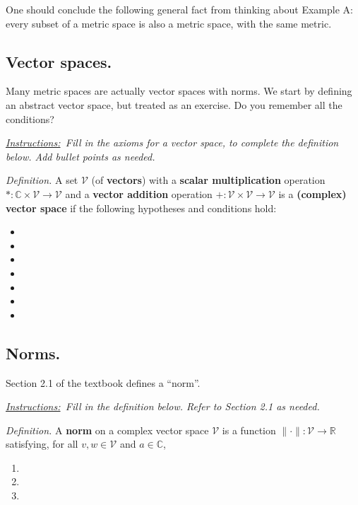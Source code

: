 \documentclass[12pt]{article}
\newcommand{\cV}{\mathcal{V}}
\newcommand{\CC}{\mathbb{C}}
\newcommand{\RR}{\mathbb{R}}
\newcommand{\sect}[1]{\subsection*{#1.}}
\newcommand{\defin}{\emph{Definition.}\,\,}
\newcommand{\instruct}[2]{\emph{\underline{Instructions:}\, #2} \vspace*{#1mm}}
\begin{document}
One should conclude the following general fact from thinking about Example A: every subset of a metric space is also a metric space, with the same metric.


\sect{Vector spaces}  Many metric spaces are actually vector spaces with norms.  We start by defining an abstract vector space, but treated as an exercise.  Do you remember all the conditions?

\instruct{0}{Fill in the axioms for a vector space, to complete the definition below.  Add bullet points as needed.}

\defin A set $\cV$ (of \textbf{vectors}) with a \textbf{scalar multiplication} operation $*:\CC\times \cV \to \cV$ and a \textbf{vector addition} operation $+:\cV\times \cV\to \cV$ is a \textbf{(complex) vector space} if the following hypotheses and conditions hold:
\begin{itemize}
\item \phantom{x} \vspace{5mm}

\item \phantom{x} \vspace{5mm}

\item \phantom{x} \vspace{5mm}

\item \phantom{x} \vspace{5mm}

\item \phantom{x} \vspace{5mm}

\item \phantom{x} \vspace{5mm}

\item \phantom{x} \vspace{25mm}

\end{itemize}


\sect{Norms} \label{topic:norms}

Section 2.1 of the textbook defines a ``norm''.

\instruct{0}{Fill in the definition below.  Refer to Section 2.1 as needed.}

\defin A \textbf{norm} on a complex vector space $\cV$ is a function $\|\cdot\|:\cV \to \RR$ satisfying, for all $v,w\in\cV$ and $a\in \CC$,
\begin{enumerate}
\item \phantom{foo} \vspace{5mm}

\item \phantom{foo} \vspace{5mm}

\item \phantom{foo} \vspace{7mm}

\end{enumerate}
\end{document}
